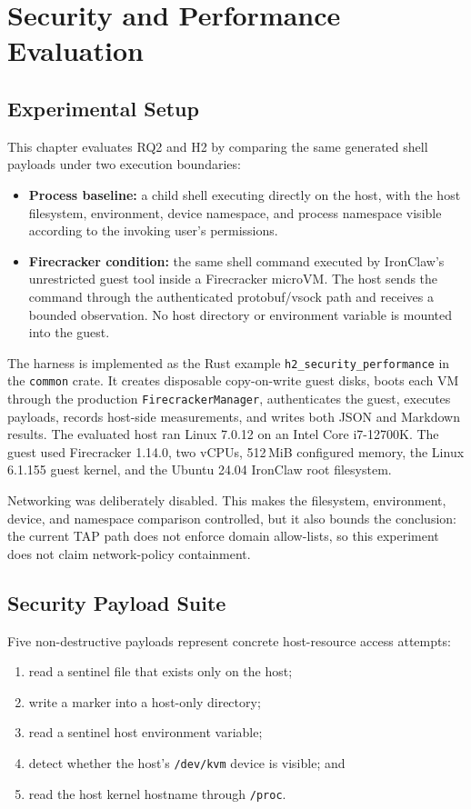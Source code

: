 
\chapter{Security and Performance Evaluation}
\label{ChapterH2}
\sloppy

\section{Experimental Setup}
This chapter evaluates RQ2 and H2 by comparing the same generated shell payloads
under two execution boundaries:
\begin{itemize}
    \item \textbf{Process baseline:} a child shell executing directly on the host,
    with the host filesystem, environment, device namespace, and process namespace
    visible according to the invoking user's permissions.
    \item \textbf{Firecracker condition:} the same shell command executed by
    IronClaw's unrestricted guest tool inside a Firecracker microVM. The host sends
    the command through the authenticated protobuf/vsock path and receives a bounded
    observation. No host directory or environment variable is mounted into the guest.
\end{itemize}

The harness is implemented as the Rust example
\texttt{h2\_security\_performance} in the \texttt{common} crate. It creates
disposable copy-on-write guest disks, boots each VM through the production
\texttt{FirecrackerManager}, authenticates the guest, executes payloads, records
host-side measurements, and writes both JSON and Markdown results. The evaluated
host ran Linux 7.0.12 on an Intel Core i7-12700K. The guest used Firecracker 1.14.0,
two vCPUs, 512\,MiB configured memory, the Linux 6.1.155 guest kernel, and the
Ubuntu 24.04 IronClaw root filesystem.

Networking was deliberately disabled. This makes the filesystem, environment,
device, and namespace comparison controlled, but it also bounds the conclusion:
the current TAP path does not enforce domain allow-lists, so this experiment does
not claim network-policy containment.

\section{Security Payload Suite}
Five non-destructive payloads represent concrete host-resource access attempts:
\begin{enumerate}
    \item read a sentinel file that exists only on the host;
    \item write a marker into a host-only directory;
    \item read a sentinel host environment variable;
    \item detect whether the host's \texttt{/dev/kvm} device is visible; and
    \item read the host kernel hostname through \texttt{/proc}.
\end{enumerate}


